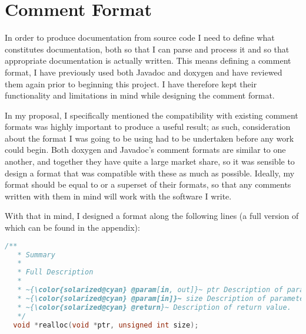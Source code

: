 \section{Comment Format}
In order to produce documentation from source code I need to define what
constitutes documentation, both so that I can parse and process it and so that
appropriate documentation is actually written. This means defining a comment
format, I have previously used both Javadoc and doxygen and have reviewed them
again prior to beginning this project. I have therefore kept their functionality
and limitations in mind while designing the comment format.

In my proposal, I specifically mentioned the compatibility with existing comment
formats was highly important to produce a useful result; as such, consideration
about the format I was going to be using had to be undertaken before any work
could begin. Both doxygen and Javadoc's comment formats are similar to one
another, and together they have quite a large market share, so it was sensible
to design a format that was compatible with these as much as possible. Ideally,
my format should be equal to or a superset of their formats, so that any
comments written with them in mind will work with the software I write.

With that in mind, I designed a format along the following lines (a full version
of which can be found in the appendix):

\begin{lstlisting}[language=c, escapechar=~]
  /**
   * Summary
   *
   * Full Description
   *
   * ~{\color{solarized@cyan} @param[in, out]}~ ptr Description of parameter ptr
   * ~{\color{solarized@cyan} @param[in]}~ size Description of parameter size
   * ~{\color{solarized@cyan} @return}~ Description of return value.
   */
  void *realloc(void *ptr, unsigned int size);
\end{lstlisting}

